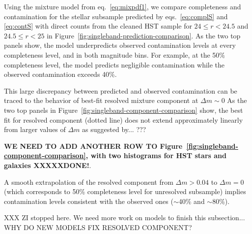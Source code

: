 Using the mixture model from eq.~\ref{eq:mixpdf1}, we compare 
completeness and contamination for the stellar subsample predicted by
eqs.~\ref{eq:complS} and \ref{eq:contS} with direct counts from the cleaned HST sample
for $24\leq r<24.5$ and $24.5\leq r<25$ in Figure~\ref{fig:singleband-prediction-comparison}.
As the two top panels show, the model underpredicts observed contamination levels
at every completeness level, and in both magnitude bins. For example, at the 50\% completeness
level, the model predicts negligible contamination while the observed contamination exceeds 40\%.

This large discrepancy between predicted and observed contamination can be traced to
the behavior of best-fit resolved mixture component at $\Delta m \sim 0$ As the two top panels
in Figure~\ref{fig:singleband-component-comparison} show, the best fit for resolved component
(dotted line) does not extend approximately linearly from larger values of $\Delta m$ as suggested
by... ??? 


{\bf WE NEED TO ADD ANOTHER ROW TO Figure~\ref{fig:singleband-component-comparison},
  with two histograms for HST stars and galaxies XXXXXDONE!}. 

A smooth extrapolation of the resolved component from $\Delta m > 0.04$ to $\Delta m = 0$
(which corresponds to 50\% completeness level for unresolved subsample)  implies contamination
levels consistent with the observed ones ($\sim$40\% and $\sim$80\%). 

XXX ZI stopped here. We need more work on models to finish this subsection...
WHY DO NEW MODELS FIX RESOLVED COMPONENT? 

  







